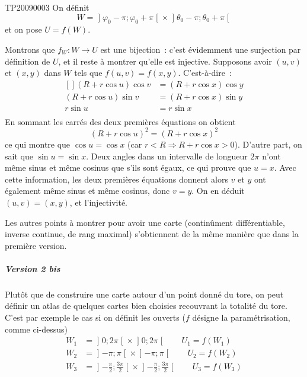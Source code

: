 \begin{corrige}{TP20090003}
On définit
\begin{equation*}
  W = \mathopen]\varphi_0 - \pi; \varphi_0 + \pi\mathclose[
  \times \mathopen]\theta_0 - \pi; \theta_0 + \pi\mathclose[
\end{equation*}
et on pose $U = f(W)$.

Montrons que $f_W : W \to U$ est une bijection~: c'est évidemment
une surjection par définition de $U$, et il reste à montrer qu'elle
est injective. Supposons avoir $(u,v)$ et $(x,y)$ dans $W$ tels que
$f(u,v) = f(x,y)$. C'est-à-dire~:
\begin{equation}
	\begin{aligned}[]
  (R + r\cos u) \cos v 	&= (R + r\cos x) \cos y\\
  (R + r\cos u) \sin v 	&= (R + r\cos x) \sin y \\
  r \sin u		& = r \sin x\\
	\end{aligned}
\end{equation}
En sommant les carrés des deux premières équations on obtient
\begin{equation*}
  (R + r\cos u)^2 = (R + r\cos x)^2
\end{equation*}
ce qui montre que $\cos u = \cos x$ (car $r < R \Rightarrow R + r\cos
x > 0$). D'autre part, on sait que $\sin u = \sin x$. Deux angles dans
un intervalle de longueur $2 \pi$ n'ont même sinus et même cosinus que
s'ils sont égaux, ce qui prouve que $u = x$. Avec cette information,
les deux premières équations donnent alors $v$ et $y$ ont également
même sinus et même cosinus, donc $v = y$. On en déduit $(u,v) =
(x,y)$, et l'injectivité.

Les autres points à montrer pour avoir une carte (continûment
différentiable, inverse continue, de rang maximal) s'obtiennent de la
même manière que dans la première version.

\subparagraph{Version 2 bis}Plutôt que de construire une carte autour
d'un point donné du tore, on peut définir un atlas de quelques cartes
bien choisies recouvrant la totalité du tore. C'est par exemple le cas
si on définit les ouverts ($f$ désigne la paramétrisation, comme ci-dessus)
\begin{equation*}
  \begin{split}
    W_1 &= \mathopen]0; 2 \pi\mathclose[ \times \mathopen]0; 2
    \pi\mathclose[ \qquad U_1 = f(W_1)\\
    W_2 &= \mathopen]-\pi; \pi\mathclose[ \times \mathopen]-\pi;
    \pi\mathclose[ \qquad U_2 = f(W_2)\\
    W_3 &= \mathopen]-\frac\pi2; \frac{3\pi}2\mathclose[ \times \mathopen]-\frac\pi2;
    \frac{3\pi}2\mathclose[ \qquad U_3 = f(W_3)\\
  \end{split}
\end{equation*}


\end{corrige}

